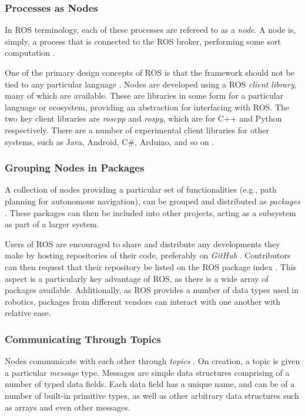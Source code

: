\subsubsection{Processes as Nodes}
In ROS terminology, each of these processes are refereed to as a \emph{node}. A node is, simply, a process that is connected to the ROS broker, performing some sort computation \cite{ros_paper}.

One of the primary design concepts of ROS is that the framework should not be tied to any particular language \cite{ros_paper}. Nodes are developed using a ROS \emph{client library}, many of which are available. These are libraries in some form for a particular language or ecosystem, providing an abstraction for interfacing with ROS. The two key client libraries are \emph{roscpp} and \emph{rospy}, which are for C++ and Python respectively. There are a number of experimental client libraries for other systems, such as Java, Android, C\#, Arduino, and so on \cite{ros_wiki_clientlibraries}.

\subsubsection{Grouping Nodes in Packages}
A collection of nodes providing a particular set of functionalities (e.g., path planning for autonomous navigation), can be grouped and distributed as \emph{packages} \cite{ros_paper}. These packages can then be included into other projects, acting as a subsystem as part of a larger system.

Users of ROS are encouraged to share and distribute any developments they make by hosting repositories of their code, preferably on \emph{GitHub} \cite{ros_wiki_getinvolved}. Contributors can then request that their repository be listed on the ROS package index \cite{ros_wiki_getinvolved}. This aspect is a particularly key advantage of ROS, as there is a wide array of packages available. Additionally, as ROS provides a number of data types used in robotics, packages from different vendors can interact with one another with relative ease.

\subsubsection{Communicating Through Topics}
Nodes communicate with each other through \emph{topics} \cite{ros_paper}. On creation, a topic is given a particular \emph{message} type. Messages are simple data structures comprising of a number of typed data fields. Each data field has a unique name, and can be of a number of built-in primitive types, as well as other arbitrary data structures such as arrays and even other messages.

